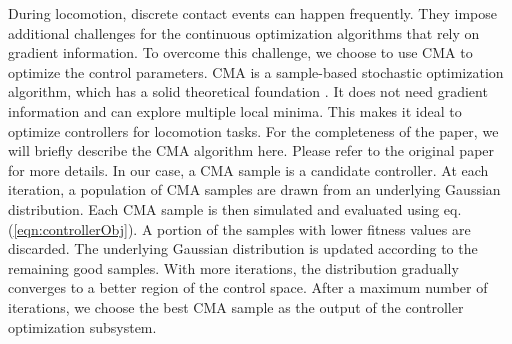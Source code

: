 During locomotion, discrete contact events can happen frequently. They impose additional challenges for the continuous optimization algorithms that rely on gradient information. To overcome this challenge, we choose to use CMA to optimize the control parameters. CMA is a sample-based stochastic optimization algorithm, which has a solid theoretical foundation \cite{akimoto:2010,glasmachers:2010}. It does not need gradient information and can explore multiple local minima. This makes it ideal to optimize controllers for locomotion tasks. For the completeness of the paper, we will briefly describe the CMA algorithm here. Please refer to the original paper \cite{Hansen:2009} for more details. In our case, a CMA sample is a candidate controller. At each iteration, a population of CMA samples are drawn from an underlying Gaussian distribution. Each CMA sample is then simulated and evaluated using eq.(\ref{eqn:controllerObj}). A portion of the samples with lower fitness values are discarded. The underlying Gaussian distribution is updated according to the remaining good samples. With more iterations, the distribution gradually converges to a better region of the control space. After a maximum number of iterations, we choose the best CMA sample as the output of the controller optimization subsystem.
